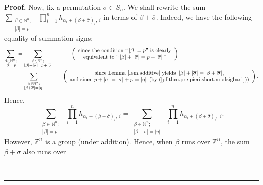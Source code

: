 \documentclass
[numbers=enddot,12pt,final,onecolumn,notitlepage,english]{scrartcl}%
\theoremstyle{definition}
\newenvironment{proof}[1][Proof]{\noindent\textbf{#1.} }{\ \rule{0.5em}{0.5em}}
\let\sumnonlimits\sum
\let\prodnonlimits\prod
\renewcommand{\sum}{\sumnonlimits\limits}
\renewcommand{\prod}{\prodnonlimits\limits}
\newenvironment{vershort}{}{}
\begin{document}
\begin{vershort}
\begin{proof}
Now, fix a permutation $\sigma\in S_{n}$. We shall rewrite the sum
$\sum_{\substack{\beta\in\mathbb{N}^{n};\\\left\vert \beta\right\vert
=p}}\ \ \prod_{i=1}^{n}h_{\alpha_{i}+\left(  \beta+\overline{\sigma}\right)
_{i},\ i}$ in terms of $\beta+\overline{\sigma}$. Indeed, we have the
following equality of summation signs:%
\begin{align*}
\sum_{\substack{\beta\in\mathbb{N}^{n};\\\left\vert \beta\right\vert =p}}  &
=\sum_{\substack{\beta\in\mathbb{N}^{n};\\\left\vert \beta\right\vert
+\left\vert \overline{\sigma}\right\vert =p+\left\vert \overline{\sigma
}\right\vert }}\ \ \ \ \ \ \ \ \ \ \left(
\begin{array}
[c]{c}%
\text{since the condition \textquotedblleft}\left\vert \beta\right\vert
=p\text{\textquotedblright\ is clearly}\\
\text{equivalent to \textquotedblleft}\left\vert \beta\right\vert +\left\vert
\overline{\sigma}\right\vert =p+\left\vert \overline{\sigma}\right\vert
\text{\textquotedblright}%
\end{array}
\right) \\
&  =\sum_{\substack{\beta\in\mathbb{N}^{n};\\\left\vert \beta+\overline
{\sigma}\right\vert =\left\vert \eta\right\vert }}\ \ \ \ \ \ \ \ \ \ \left(
\begin{array}
[c]{c}%
\text{since Lemma \ref{lem.additive} yields }\left\vert \beta\right\vert
+\left\vert \overline{\sigma}\right\vert =\left\vert \beta+\overline{\sigma
}\right\vert \text{,}\\
\text{and since }p+\left\vert \overline{\sigma}\right\vert =\left\vert
\overline{\sigma}\right\vert +p=\left\vert \eta\right\vert \text{ (by
(\ref{pf.thm.pre-pieri.short.modsigbar1}))}%
\end{array}
\right)  .
\end{align*}
Hence,%
\[
\sum_{\substack{\beta\in\mathbb{N}^{n};\\\left\vert \beta\right\vert
=p}}\ \ \prod_{i=1}^{n}h_{\alpha_{i}+\left(  \beta+\overline{\sigma}\right)
_{i},\ i}=\sum_{\substack{\beta\in\mathbb{N}^{n};\\\left\vert \beta
+\overline{\sigma}\right\vert =\left\vert \eta\right\vert }}\ \ \prod
_{i=1}^{n}h_{\alpha_{i}+\left(  \beta+\overline{\sigma}\right)  _{i},\ i}.
\]
However, $\mathbb{Z}^{n}$ is a group (under addition). Hence, when $\beta$
runs over $\mathbb{Z}^{n}$, the sum $\beta+\overline{\sigma}$ also runs over

\end{proof}
\end{vershort}
\end{document}
